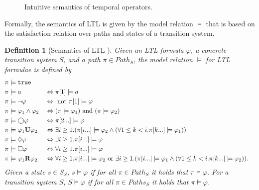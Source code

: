 \documentclass[a4paper, 12pt, twoside]{report}
\theoremstyle{plain}
\newtheorem{definition}[theorem]{Definition}
\begin{document}
\begin{figure}[h!]
\begin{center}
		\caption{Intuitive semantics of temporal operators.}\label{fig:temporal_ops}
		\end{center}
	\end{figure}

	Formally, the semantics of LTL is given by the model relation $\models$ that is based on the satisfaction relation over paths and states of a transition system.
	

	\begin{definition}[Semantics of LTL \cite{baier2008principles}]\label{def:ltl_semantics}
		Given an LTL formula $\varphi$, a concrete transition system $S$, and a path $\pi \in Path_S$, the model relation $\models$ for LTL formulae is defined by
		\begin{align*}
			\pi &\models \texttt{\textup{true}}   \\
			\pi &\models a &&\Leftrightarrow \pi[1] \models a\\			
			\pi &\models \neg \varphi &&\Leftrightarrow \textup{ not } \pi[1] \models \varphi\\
			\pi &\models \varphi_1 \wedge \varphi_2 &&\Leftrightarrow (\pi \models \varphi_1) \textup{ and } (\pi \models \varphi_2)\\
			\pi &\models \bigcirc \varphi &&\Leftrightarrow \pi[2...] \models \varphi\\
			\pi &\models \varphi_1 \textbf{\textup{U}} \varphi_2 &&\Leftrightarrow \exists i \geq 1.(\pi[i...] \models \varphi_2 \wedge (\forall 1\leq k < i. \pi[k...] \models \varphi_1))\\
			\pi &\models \lozenge \varphi &&\Leftrightarrow \exists i \geq 1.\pi[i...] \models \varphi\\
			\pi &\models \square \varphi &&\Leftrightarrow \forall i \geq 1. \pi[i...] \models \varphi\\
			\pi &\models \varphi_1 \textbf{\textup{R}} \varphi_2  &&\Leftrightarrow \forall i \geq 1.\pi[i...]\models \varphi_2 \textup{ or } \exists i \geq 1.(\pi[i...] \models \varphi_1 \wedge (\forall 1\leq k < i. \pi[k...] \models \varphi_2)).
		\end{align*}
		Given a state $s\in S_S$, $s \models \varphi$ if for all $\pi \in Path_S$ it holds that $\pi \models \varphi$. For a transition system $S$, $S \models \varphi$ if for all $\pi \in Paths_S$ it holds that $\pi \models \varphi$. %
	\end{definition}
\end{document}
